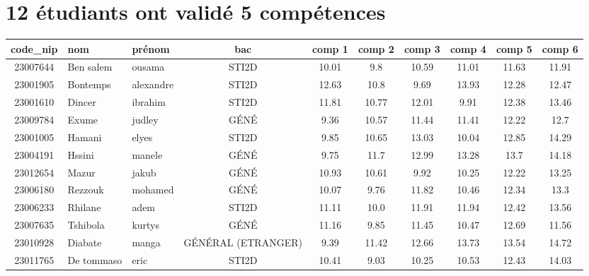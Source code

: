 \documentclass{article}%
\begin{document}
%
\section*{12 étudiants ont validé 5 compétences}%
\label{sec:12tudiantsontvalid5comptences}%
\begin{tabular}{|c|l|l|c|c|c|c|c|c|c|}%
\hline%
\rowcolor{jaune}%
code\_nip&nom&prénom&bac&comp 1&comp 2&comp 3&comp 4&comp 5&comp 6\\%
\hline%
23007644&Ben salem&ousama&STI2D&10.01&9.8&10.59&11.01&11.63&11.91\\%
\hline%
23001905&Bontemps&alexandre&STI2D&12.63&10.8&9.69&13.93&12.28&12.47\\%
\hline%
23001610&Dincer&ibrahim&STI2D&11.81&10.77&12.01&9.91&12.38&13.46\\%
\hline%
23009784&Exume&judley&GÉNÉ&9.36&10.57&11.44&11.41&12.22&12.7\\%
\hline%
23001005&Hamani&elyes&STI2D&9.85&10.65&13.03&10.04&12.85&14.29\\%
\hline%
23004191&Hssini&manele&GÉNÉ&9.75&11.7&12.99&13.28&13.7&14.18\\%
\hline%
23012654&Mazur&jakub&GÉNÉ&10.93&10.61&9.92&10.25&12.22&13.25\\%
\hline%
23006180&Rezzouk&mohamed&GÉNÉ&10.07&9.76&11.82&10.46&12.34&13.3\\%
\hline%
23006233&Rhilane&adem&STI2D&11.11&10.0&11.91&11.94&12.42&13.56\\%
\hline%
23007635&Tshibola&kurtys&GÉNÉ&11.16&9.85&11.45&10.47&12.69&11.56\\%
\hline%
23010928&Diabate&manga&GÉNÉRAL (ETRANGER)&9.39&11.42&12.66&13.73&13.54&14.72\\%
\hline%
23011765&De tommaso&eric&STI2D&10.41&9.03&10.25&10.53&12.43&14.03\\%
\hline%
\end{tabular}

%
\end{document}
